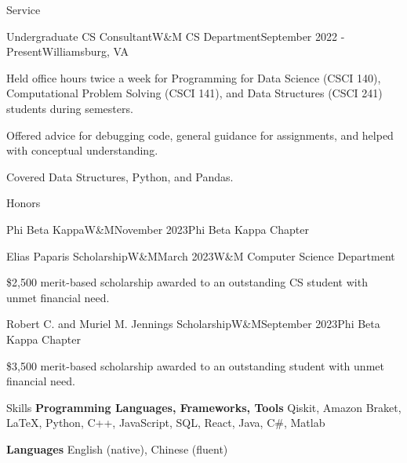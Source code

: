 \documentclass{resume} %
\begin{document}
\begin{rSection}{Service}
    \begin{rSubsection}{Undergraduate CS Consultant}{W\&M CS Department}{September 2022 - Present}{Williamsburg, VA}
        \startitems
        \item Held office hours twice a week for Programming for Data Science (CSCI 140), 	Computational Problem Solving (CSCI 141), and Data Structures (CSCI 241) students during semesters.
        \item Offered advice for debugging code, general guidance for assignments, and helped with conceptual understanding.
        \item Covered Data Structures, Python, and Pandas.
    \end{rSubsection}
\end{rSection}

\begin{rSection}{Honors}
    \begin{rSubsection}{Phi Beta Kappa}{W\&M}{November 2023}{Phi Beta Kappa Chapter} \end{rSubsection}

    \begin{rSubsection}{Elias Paparis Scholarship}{W\&M}{March 2023}{W\&M Computer Science Department}
        \startitems
        \item \$2,500 merit-based scholarship awarded to an outstanding CS student with unmet financial need.
    \end{rSubsection}

    \begin{rSubsection}{Robert C. and Muriel M. Jennings Scholarship}{W\&M}{September 2023}{Phi Beta Kappa Chapter} 
        \startitems
        \item \$3,500 merit-based scholarship awarded to an outstanding student with unmet financial need.
    \end{rSubsection}
\end{rSection}

\begin{rSection}{Skills}
    {\bf Programming Languages, Frameworks, Tools} 
    \quad Qiskit, Amazon Braket, \LaTeX, Python, C++, JavaScript, SQL, React, Java, C\#, Matlab
    
    {\bf Languages}
    \quad English (native), Chinese (fluent)
\end{rSection}
\end{document}
